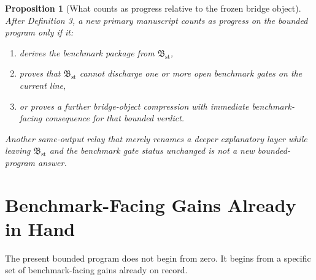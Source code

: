 \documentclass[11pt]{article}
\newcommand{\StableBridgeObject}{\mathfrak B_{\mathrm{st}}}
\newtheorem{proposition}{Proposition}
\begin{document}
\begin{proposition}[What counts as progress relative to the frozen bridge object]
After Definition 3, a new primary manuscript counts as progress on the bounded program only if it:
\begin{enumerate}
    \item derives the benchmark package from \(\StableBridgeObject\),
    \item proves that \(\StableBridgeObject\) cannot discharge one or more open benchmark gates on the current line,
    \item or proves a further bridge-object compression with immediate benchmark-facing consequence for that bounded verdict.
\end{enumerate}
Another same-output relay that merely renames a deeper explanatory layer while leaving \(\StableBridgeObject\) and the benchmark gate status unchanged is not a new bounded-program answer.
\end{proposition}

\section{Benchmark-Facing Gains Already in Hand}

The present bounded program does not begin from zero. It begins from a specific set of benchmark-facing gains already on record.
\end{document}
